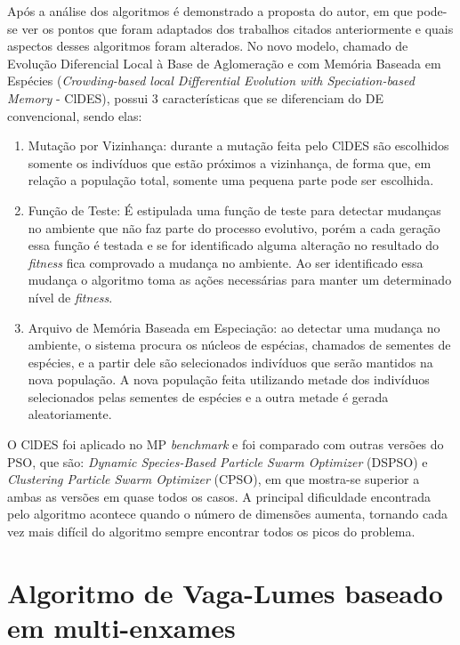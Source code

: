 Após a análise dos algoritmos é demonstrado a proposta do autor, em que pode-se ver os pontos que foram adaptados dos trabalhos citados anteriormente e quais aspectos desses algoritmos foram alterados. No novo modelo, chamado de Evolução Diferencial Local à Base de Aglomeração e com Memória Baseada em Espécies (\textit{Crowding-based local Differential Evolution with Speciation-based Memory} - ClDES), possui 3 características que se diferenciam do DE convencional, sendo elas:

\begin{enumerate}
\item Mutação por Vizinhança: durante a mutação feita pelo ClDES são escolhidos somente os indivíduos que estão próximos a vizinhança, de forma que, em relação a população total, somente uma pequena parte pode ser escolhida.

\item Função de Teste: É estipulada uma função de teste para detectar mudanças no ambiente que não faz parte do processo evolutivo, porém a cada geração essa função é testada e se for identificado alguma alteração no resultado do \textit{fitness} fica comprovado a mudança no ambiente. Ao ser identificado essa mudança o algoritmo toma as ações necessárias para manter um determinado nível de \textit{fitness}.

\item Arquivo de Memória Baseada em Especiação: ao detectar uma mudança no ambiente, o sistema procura os núcleos de espécias, chamados de sementes de espécies, e a partir dele são selecionados indivíduos que serão mantidos na nova população. A nova população feita utilizando metade dos indivíduos selecionados pelas sementes de espécies e a outra metade é gerada aleatoriamente.
\end{enumerate}

O ClDES foi aplicado no MP \textit{benchmark} e foi comparado com outras versões do PSO, que são: \textit{Dynamic Species-Based Particle Swarm Optimizer} (DSPSO) e \textit{Clustering Particle Swarm Optimizer} (CPSO), em que mostra-se superior a ambas as versões em quase todos os casos. A principal dificuldade encontrada pelo algoritmo acontece quando o número de dimensões aumenta, tornando cada vez mais difícil do algoritmo sempre encontrar todos os picos do problema.

\section{Algoritmo de Vaga-Lumes baseado em multi-enxames}
\label{sec:fa_behaviour}

